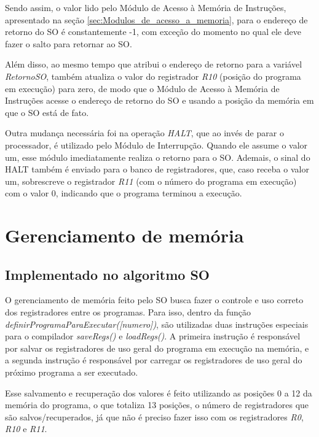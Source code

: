 \documentclass[
	12pt,				%
	oneside,
	a4paper,			%
	english,			%
	french,				%
	spanish,			%
	brazil,				%
	]{abntex2}
\begin{document}
Sendo assim, o valor lido pelo Módulo de Acesso à Memória de Instruções, apresentado na seção \autoref{sec:Modulos_de_acesso_a_memoria}, para o endereço de retorno do SO é constantemente -1, com exceção do momento no qual ele deve fazer o salto para retornar ao SO.

Além disso, ao mesmo tempo que atribui o endereço de retorno para a variável \textit{RetornoSO}, também atualiza o valor do registrador \textit{R10} (posição do programa em execução) para zero, de modo que o Módulo de Acesso à Memória de Instruções acesse o endereço de retorno do SO e usando a posição da memória em que o SO está de fato.

Outra mudança necessária foi na operação \textit{HALT}, que ao invés de parar o processador, é utilizado pelo Módulo de Interrupção. Quando ele assume o valor um, esse módulo imediatamente realiza o retorno para o SO. Ademais, o sinal do HALT também é enviado para o banco de registradores, que, caso receba o valor um, sobrescreve o registrador \textit{R11} (com o número do programa em execução) com o valor 0, indicando que o programa terminou a execução.

\section{Gerenciamento de memória}

\subsection{Implementado no algoritmo SO}
\label{sec:gerenciamento_memoria_implementado_no_algortimo_SO}

O gerenciamento de memória feito pelo SO busca fazer o controle e uso correto dos registradores entre os programas. Para isso, dentro da função \textit{definirProgramaParaExecutar([numero])}, são utilizadas duas instruções especiais para o compilador \textit{saveRegs()} e \textit{loadRegs()}. A primeira instrução é responsável por salvar os registradores de uso geral do programa em execução na memória, e a segunda instrução é responsável por carregar os registradores de uso geral do próximo programa a ser executado. 

Esse salvamento e recuperação dos valores é feito utilizando as posições 0 a 12 da memória do programa, o que totaliza 13 posições, o número de registradores que são salvos/recuperados, já que não é preciso fazer isso com os registradores \textit{R0}, \textit{R10} e \textit{R11}.
\end{document}
